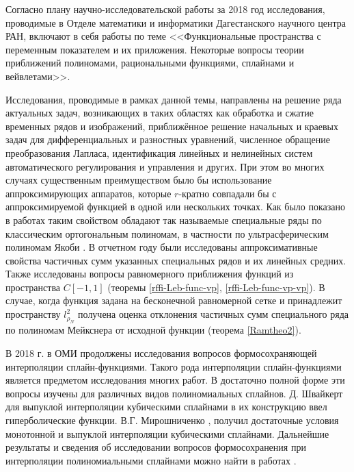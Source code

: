\Introduction

Согласно плану научно-исследовательской работы за 2018 год исследования, проводимые в Отделе математики и информатики Дагестанского научного центра РАН, включают в себя работы по теме
<<Функциональные пространства с переменным показателем и их приложения. Некоторые вопросы теории приближений полиномами, рациональными функциями, сплайнами и вейвлетами>>.

Исследования, проводимые в рамках данной темы, направлены на решение ряда актуальных задач, возникающих в таких областях как обработка и сжатие временных рядов и изображений, приближённое решение начальных и краевых задач для дифференциальных и разностных уравнений, численное обращение преобразования Лапласа, идентификация линейных и нелинейных систем автоматического регулирования и управления и других.
При этом во многих случаях существенным преимуществом было бы использование аппроксимирующих аппаратов, которые $r$-кратно  совпадали бы с аппроксимируемой функцией в одной или нескольких точках.
Как было показано в работах \cite{rffi-13, rffi-14, rffi-15, laplas-Shar11, RamVMJ} таким свойством обладают так называемые специальные ряды по классическим ортогональным полиномам, в частности по ультрасферическим полиномам Якоби \cite{rffi-13}.
В отчетном году были исследованы аппроксимативные свойства частичных сумм указанных специальных рядов  и их линейных средних. %
Также исследованы вопросы равномерного приближения функций из пространства $C[-1,1]$ (теоремы \ref{rffi-Leb-func-vp}, \ref{rffi-Leb-func-vp-vp}).
В случае, когда функция задана на бесконечной равномерной сетке и принадлежит пространству $l^2_{\rho_N}$ получена оценка отклонения частичных сумм специального ряда по полиномам Мейкснера от исходной функции (теорема \ref{Ramtheo2}).

В 2018 г. в ОМИ продолжены исследования вопросов формосохраняющей интерполяции сплайн-функциями.
Такого рода интерполяции сплайн-функциями
является предметом исследования многих работ. В достаточно полной форме эти вопросы изучены для различных
видов полиномиальных сплайнов. Д. Швайкерт \cite{ark-1} для выпуклой интерполяции кубическими
сплайнами в их конструкцию ввел гиперболические функции. В.Г. Мирошниченко \cite{ark-2},\cite{ark-3}
получил достаточные условия монотонной и выпуклой интерполяции кубическими сплайнами.
Дальнейшие результаты и сведения об исследовании вопросов формосохранения при интерполяции
полиномиальными сплайнами можно найти в работах \cite{ark-4, ark-5, ark-6, ark-7}.

